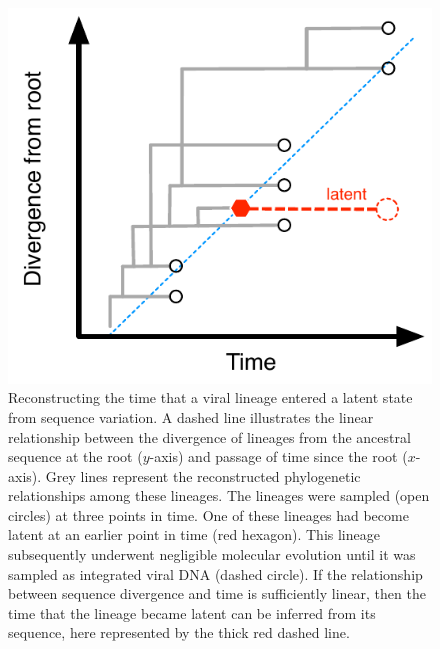 \documentclass[12pt]{article}
\begin{document}
\begin{figure}[ht]
	\centering
	\includegraphics{figures/latency-scheme}
	\caption[]{ 
	Reconstructing the time that a viral lineage entered a latent state from sequence variation.  
	A dashed line illustrates the linear relationship between the divergence of lineages from the ancestral sequence at the root ($y$-axis) and passage of time since the root ($x$-axis).
	Grey lines represent the reconstructed phylogenetic relationships among these lineages.
	The lineages were sampled (open circles) at three points in time.
	One of these lineages had become latent at an earlier point in time (red hexagon).
	This lineage subsequently underwent negligible molecular evolution until it was sampled as integrated viral DNA (dashed circle).
	If the relationship between sequence divergence and time is sufficiently linear, then the time that the lineage became latent can be inferred from its sequence, here represented by the thick red dashed line.
	}
	\label{fig:latenttree}
\end{figure}
\end{document}

